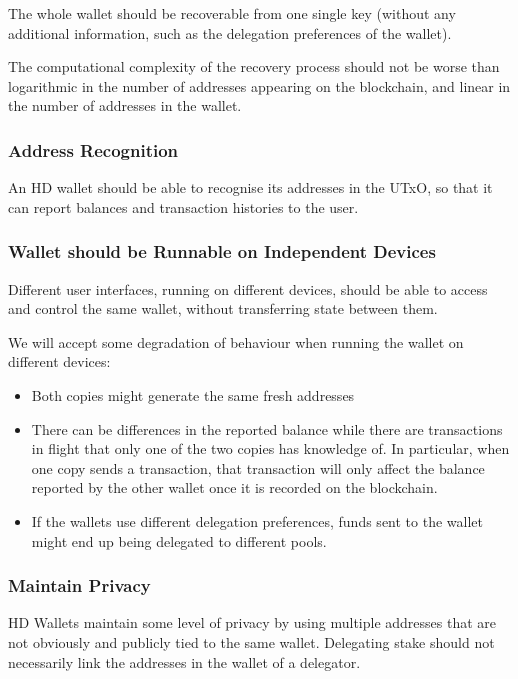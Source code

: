 \documentclass[11pt,a4paper,dvipsnames,twosided]{article}
\begin{document}
The whole wallet should be recoverable from one single key (without any
additional information, such as the delegation preferences of the
wallet).

The computational complexity of the recovery process should not be worse
than logarithmic in the number of addresses appearing on the blockchain,
and linear in the number of addresses in the wallet.

\subsubsection{Address Recognition}
\label{address-recognition}

An HD wallet should be able to recognise its addresses in the UTxO, so
that it can report balances and transaction histories to the user.

\subsubsection{Wallet should be Runnable on Independent Devices}
\label{wallet-should-be-runnable-on-independent-devices}

Different user interfaces, running on different devices, should be able
to access and control the same wallet, without transferring state
between them.

We will accept some degradation of behaviour when running the wallet on
different devices:

\begin{itemize}
\item
  Both copies might generate the same fresh addresses
\item
  There can be differences in the reported balance while there are
  transactions in flight that only one of the two copies has knowledge
  of. In particular, when one copy sends a transaction, that transaction
  will only affect the balance reported by the other wallet once it is
  recorded on the blockchain.
\item
  If the wallets use different delegation preferences, funds sent to the
  wallet might end up being delegated to different pools.
\end{itemize}

\subsubsection{Maintain Privacy}
\label{maintain-privacy}

HD Wallets maintain some level of privacy by using multiple addresses
that are not obviously and publicly tied to the same wallet. Delegating
stake should not necessarily link the addresses in the wallet of a
delegator.
\end{document}
